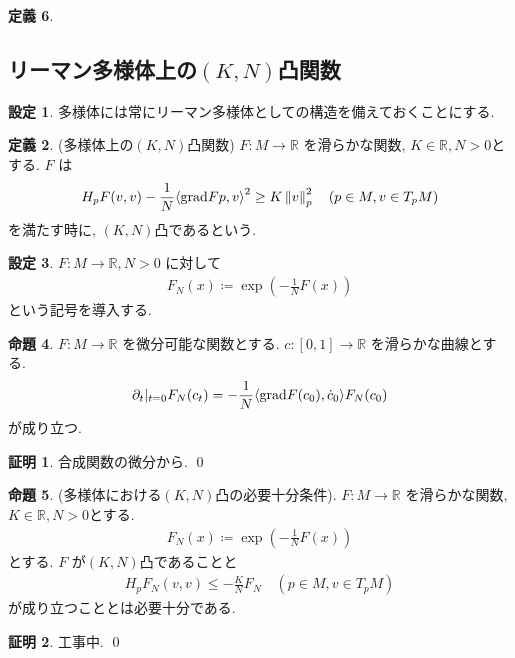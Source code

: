 \documentclass[10pt, fleqn, label-section=none]{bxjsarticle}
\theoremstyle{definition}
\newtheorem{dfn}{定義}[section]
\newtheorem{prop}[dfn]{命題}
\newtheorem{setting}[dfn]{設定}
\newtheorem*{pf*}{証明}
\newcommand{\tbra}[1]{\mleft\langle#1\mright\rangle}
\newcommand{\norm}[1]{\left\|#1\right\|}
\newcommand{\grad}{\textrm{grad}}
\renewcommand{\;}{\, ; \,}
\begin{document}
\begin{dfn}
\subsection{リーマン多様体上の$(K,N)$凸関数}


\begin{setting}
多様体には常にリーマン多様体としての構造を備えておくことにする. 
\end{setting}

\begin{dfn}(多様体上の$(K, N)$凸関数) $F: M \rightarrow \mathbb R$ を滑らかな関数, $K \in \mathbb R, N > 0$とする. $F$ は
\begin{align*} H_pF (v, v) - \frac{1}{N}\tbra{\grad  F p , v}^2 \geq K \norm v ^2 _p  \quad (p \in M, v \in T_p M)\end{align*}
を満たす時に, $(K,N)$凸であるという. 
\end{dfn}

\begin{setting}$F: M \rightarrow \mathbb R, N > 0$ に対して
\begin{align*} F_N (x) \coloneqq \exp (- \frac{1}{N}F(x))\end{align*}
という記号を導入する. 
\end{setting}

\begin{prop}$F: M \rightarrow \mathbb R$ を微分可能な関数とする. $c:  [0,1] \rightarrow \mathbb R$ を滑らかな曲線とする. 
\begin{align*} \partial_t |_{t = 0} F_N(c_t) = - \frac{1}{N}\tbra{\grad F (c_0), \dot c_0} F_N(c_0) \end{align*}
が成り立つ. 
\end{prop}
\begin{pf*}
合成関数の微分から. 
\qed
\end{pf*}


\begin{prop}(多様体における$(K,N)$凸の必要十分条件). $F: M \rightarrow \mathbb R$ を滑らかな関数, $K \in \mathbb R, N > 0$とする. 
\begin{align*} F_N (x) \coloneqq \exp (- \frac{1}{N}F(x))\end{align*}
とする. $F$ が$(K,N)$凸であることと
\begin{align*} H_p F_N (v,v) \leq -\frac{K}{N} F_N \quad (p \in M, v \in T_pM)\end{align*}
が成り立つこととは必要十分である. 
\end{prop}
\begin{pf*}
工事中.
\qed
\end{pf*}




\end{dfn}
\end{document}
